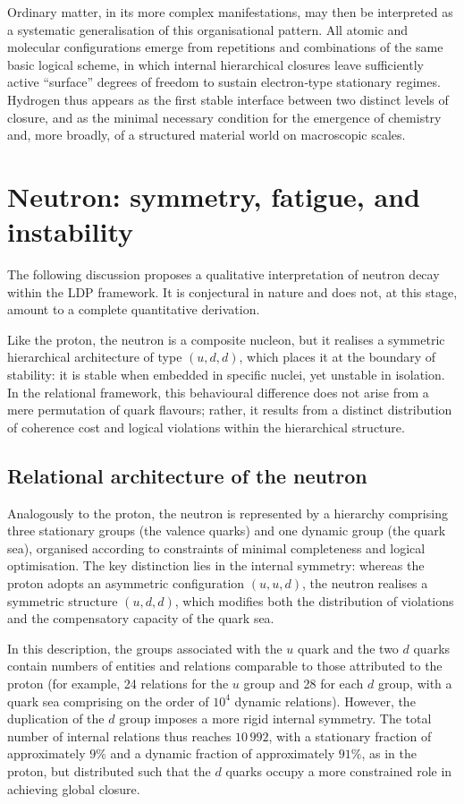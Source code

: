 \documentclass[11pt,a4paper]{article}
\begin{document}
Ordinary matter, in its more complex manifestations, may then be interpreted as a systematic generalisation of this organisational pattern. All atomic and molecular configurations emerge from repetitions and combinations of the same basic logical scheme, in which internal hierarchical closures leave sufficiently active “surface” degrees of freedom to sustain electron‑type stationary regimes. Hydrogen thus appears as the first stable interface between two distinct levels of closure, and as the minimal necessary condition for the emergence of chemistry and, more broadly, of a structured material world on macroscopic scales.

\section{Neutron: symmetry, fatigue, and instability}
The following discussion proposes a qualitative interpretation of neutron decay within the LDP framework. It is conjectural in nature and does not, at this stage, amount to a complete quantitative derivation.

Like the proton, the neutron is a composite nucleon, but it realises a symmetric hierarchical architecture of type \((u,d,d)\), which places it at the boundary of stability: it is stable when embedded in specific nuclei, yet unstable in isolation. In the relational framework, this behavioural difference does not arise from a mere permutation of quark flavours; rather, it results from a distinct distribution of coherence cost and logical violations within the hierarchical structure.

\subsection{Relational architecture of the neutron}
Analogously to the proton, the neutron is represented by a hierarchy comprising three stationary groups (the valence quarks) and one dynamic group (the quark sea), organised according to constraints of minimal completeness and logical optimisation. The key distinction lies in the internal symmetry: whereas the proton adopts an asymmetric configuration \((u,u,d)\), the neutron realises a symmetric structure \((u,d,d)\), which modifies both the distribution of violations and the compensatory capacity of the quark sea.

In this description, the groups associated with the \(u\) quark and the two \(d\) quarks contain numbers of entities and relations comparable to those attributed to the proton (for example, 24 relations for the \(u\) group and 28 for each \(d\) group, with a quark sea comprising on the order of \(10^{4}\) dynamic relations). However, the duplication of the \(d\) group imposes a more rigid internal symmetry. The total number of internal relations thus reaches \(10\,992\), with a stationary fraction of approximately \(9\%\) and a dynamic fraction of approximately \(91\%\), as in the proton, but distributed such that the \(d\) quarks occupy a more constrained role in achieving global closure.
\end{document}
